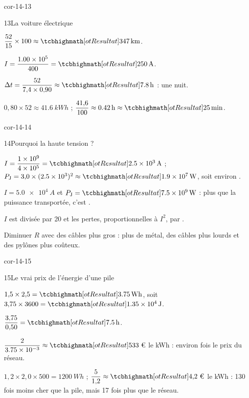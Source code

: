 \begin{blocLivre}{cor-14-13}
\begin{corrige}{13}{La voiture électrique}
\begin{questions}
\item $\dfrac{52}{15}\times100\approx\res{\qty{347}{km}}$.
\item $I=\dfrac{\num{1,00e5}}{400}=\res{\qty{250}{A}}$.
\item $\Delta t=\dfrac{52}{7{,}4\times0{,}90}\approx\res{\qty{7,8}{h}}$ : une nuit.
\item $0{,}80\times52\approx\qty{41,6}{kWh}$ ; $\dfrac{41{,}6}{100}\approx\qty{0,42}{h}\approx\res{\qty{25}{min}}$.
\end{questions}
\end{corrige}
\end{blocLivre}
\begin{blocLivre}{cor-14-14}
\begin{corrige}{14}{Pourquoi la haute tension ?}
\begin{questions}
\item $I=\dfrac{\num{1e9}}{\num{4e5}}=\res{\qty{2,5e3}{A}}$ ; $P_\mathrm{J}=3{,}0\times(\num{2,5e3})^2\approx\res{\qty{1,9e7}{W}}$, soit environ .
\item $I=\qty{5,0e4}{A}$ et $P_\mathrm{J}=\res{\qty{7,5e9}{W}}$ : plus que la puissance transportée, c'est .
\item $I$ est divisée par 20 et les pertes, proportionnelles à $I^2$, par .
\item Diminuer $R$ avec des câbles plus gros : plus de métal, des câbles plus lourds et des pylônes plus coûteux.
\end{questions}
\end{corrige}
\end{blocLivre}
\begin{blocLivre}{cor-14-15}
\begin{corrige}{15}{Le vrai prix de l'énergie d'une pile}
\begin{questions}
\item $1{,}5\times2{,}5=\res{\qty{3,75}{Wh}}$, soit $3{,}75\times3600=\res{\qty{1,35e4}{J}}$.
\item $\dfrac{3{,}75}{0{,}50}=\res{\qty{7,5}{h}}$.
\item $\dfrac{2}{\num{3,75e-3}}\approx\res{\text{533~€}}$ le kWh : environ  fois le prix du réseau.
\item $1{,}2\times2{,}0\times500=\qty{1200}{Wh}$ ; $\dfrac{5}{1{,}2}\approx\res{\text{4,2~€}}$ le kWh : 130 fois moins cher que la pile, mais 17 fois plus que le réseau.
\end{questions}
\end{corrige}
\end{blocLivre}
